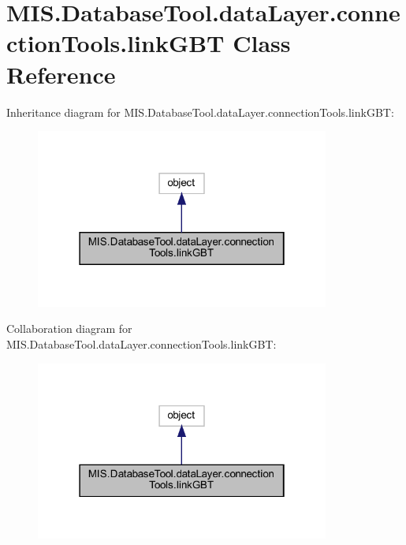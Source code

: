 \hypertarget{classMIS_1_1DatabaseTool_1_1dataLayer_1_1connectionTools_1_1linkGBT}{}\section{M\+I\+S.\+Database\+Tool.\+data\+Layer.\+connection\+Tools.\+link\+G\+BT Class Reference}
\label{classMIS_1_1DatabaseTool_1_1dataLayer_1_1connectionTools_1_1linkGBT}


Inheritance diagram for M\+I\+S.\+Database\+Tool.\+data\+Layer.\+connection\+Tools.\+link\+G\+BT\+:\nopagebreak
\begin{figure}[H]
\begin{center}
\leavevmode
\includegraphics[width=274pt]{classMIS_1_1DatabaseTool_1_1dataLayer_1_1connectionTools_1_1linkGBT__inherit__graph}
\end{center}
\end{figure}


Collaboration diagram for M\+I\+S.\+Database\+Tool.\+data\+Layer.\+connection\+Tools.\+link\+G\+BT\+:\nopagebreak
\begin{figure}[H]
\begin{center}
\leavevmode
\includegraphics[width=274pt]{classMIS_1_1DatabaseTool_1_1dataLayer_1_1connectionTools_1_1linkGBT__coll__graph}
\end{center}
\end{figure}
